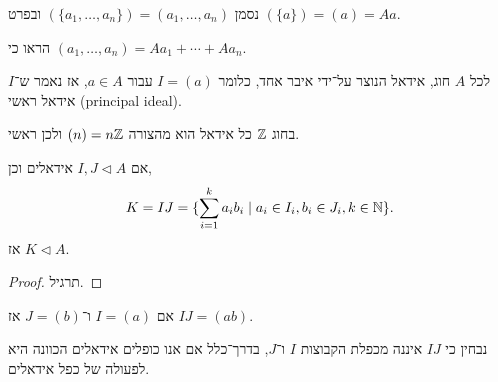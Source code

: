 \begin{notation}
	נסמן $(\{a_1, \ldots, a_n\}) = (a_1, \ldots, a_n)$ ובפרט $(\{ a \}) = (a) = A a$.
\end{notation}
\begin{exercise}
	הראו כי $(a_1, \ldots, a_n) = A a_1 + \cdots + A a_n$.
\end{exercise}
\begin{definition}
	לכל $A$ חוג, אידאל הנוצר על־ידי איבר אחד, כלומר $I = (a)$ עבור $a \in A$, אז נאמר ש־$I$ אידאל ראשי (principal ideal).
\end{definition}
\begin{example}
	בחוג $\mathbb{Z}$ כל אידאל הוא מהצורה $(n) = n \mathbb{Z}$ ולכן ראשי.
\end{example}
\begin{proposition}
	אם $I, J \triangleleft A$ אידאלים וכן,
	\[
		K
		= I J
		= \{ \sum_{i = 1}^k a_i b_i \mid a_i \in I_i, b_i \in J_i, k \in \mathbb{N} \}
	.\]
	אז $K \triangleleft A$.
\end{proposition}
\begin{proof}
	תרגיל.
\end{proof}
\begin{example}
	אם $I = (a)$ ו־$J = (b)$ אז $I J = (ab)$.
\end{example}
נבחין כי $I J$ איננה מכפלת הקבוצות $I$ ו־$J$, בדרך־כלל אם אנו כופלים אידאלים הכוונה היא לפעולה של כפל אידאלים.

